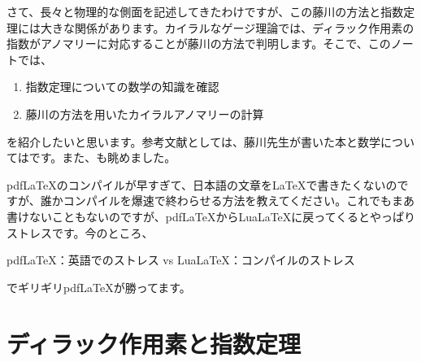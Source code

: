 \documentclass[unicode,a4paper,10pt]{ltjsarticle}
\begin{document}
さて、長々と物理的な側面を記述してきたわけですが、この藤川の方法と指数定理には大きな関係があります。カイラルなゲージ理論では、ディラック作用素の指数がアノマリーに対応することが藤川の方法で判明します。そこで、このノートでは、
\begin{enumerate}
  \item 
  指数定理についての数学の知識を確認
  \item 
  藤川の方法を用いたカイラルアノマリーの計算
\end{enumerate}
を紹介したいと思います。参考文献としては、藤川先生が書いた本\cite{Fujikawa:2001b}と数学については\cite{Nakahara:2003}です。また、\cite{Peskin:1995,Nair:2005}も眺めました。

\begin{graybox}
  {pdf\LaTeX}のコンパイルが早すぎて、日本語の文章を{\LaTeX}で書きたくないのですが、誰かコンパイルを爆速で終わらせる方法を教えてください。これでもまあ書けないこともないのですが、{pdf\LaTeX}から{Lua\LaTeX}に戻ってくるとやっぱりストレスです。今のところ、
  \begin{center}
    {pdf\LaTeX}：英語でのストレス
    \quad\textrm{vs}\quad
    {Lua\LaTeX}：コンパイルのストレス
  \end{center}
  でギリギリ{pdf\LaTeX}が勝ってます。
\end{graybox}


\section{ディラック作用素と指数定理}













\clearpage


\end{document}
